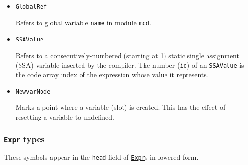 \begin{itemize}
\item \texttt{GlobalRef}

Refers to global variable \texttt{name} in module \texttt{mod}.


\item \texttt{SSAValue}

Refers to a consecutively-numbered (starting at 1) static single assignment (SSA) variable inserted by the compiler. The number (\texttt{id}) of an \texttt{SSAValue} is the code array index of the expression whose value it represents.


\item \texttt{NewvarNode}

Marks a point where a variable (slot) is created. This has the effect of resetting a variable to undefined.

\end{itemize}


\hypertarget{15302433068188215381}{}


\subsubsection{\texttt{Expr} types}



These symbols appear in the \texttt{head} field of \hyperlink{17120496304147995299}{\texttt{Expr}}s in lowered form.



